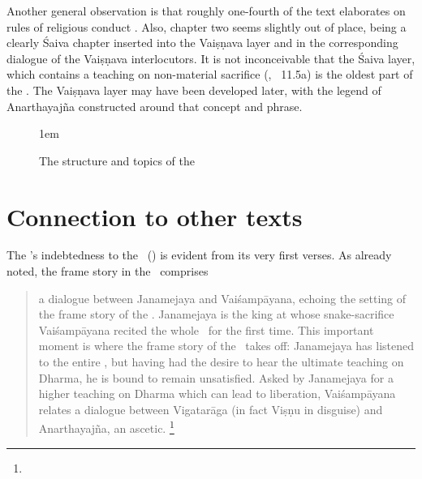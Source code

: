 Another general observation is that roughly one-fourth 
of the text elaborates on rules of religious conduct
. Also, chapter two seems slightly
out of place, being a clearly Śaiva chapter inserted
into the Vaiṣṇava layer and in the corresponding 
dialogue of the Vai\-ṣṇa\-va interlocutors.
It is not inconceivable that the Śaiva layer, which
contains a teaching on non-material sacrifice
(, \VSS\ 11.5a)
is the oldest part of the \VSS. The Vaiṣṇava layer may have 
been developed later, with the legend of Anarthayajña
constructed around that concept and phrase.



\begin{figure}[!]

\begin{center}
\thispagestyle{empty}
\vspace{0em}
\leftskip1em
\end{center}

\caption[Structure and topics of the \VSS]{The structure and topics of the \VSS\ 
   \label{fig:structlotus}}
   
\end{figure}



\section{Connection to other texts}
\label{vss_connection_other_texts}

The \VSS's indebtedness to the \MBh\ (\MBH) is evident 
from its very first verses. As already noted,
the frame story in the \VSS\  comprises

\begin{quote}
a dialogue between Janamejaya and Vaiśampāyana, 
echoing the setting of the frame story of the \MBh. 
Janamejaya is the king at whose snake-sacrifice 
Vaiśampāyana recited the whole \MBh\ for the first
time. This important moment is where the frame story 
of the \Vss\ takes off: Janamejaya has 
listened to the entire \MBh,
but having had the desire to hear the ultimate 
teaching on Dharma, he is bound to remain unsatisfied.
Asked by Janamejaya for a higher teaching
on Dharma which can lead to liberation, 
Vaiśampāyana relates a dialogue between Vigatarāga 
(in fact Viṣṇu in disguise) and Anarthayajña, an ascet­ic.%
				\footnote{}
\end{quote}
 
